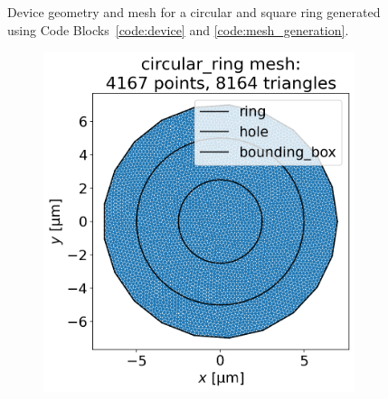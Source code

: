 \documentclass[preprint,12pt]{elsarticle}
\begin{document}
\begin{figure}
\begin{subfigure}{.45\textwidth}
  \label{fig:square_ring_mesh}
\end{subfigure}
\caption{Device geometry and mesh for a circular and square ring generated using Code Blocks~\ref{code:device} and \ref{code:mesh_generation}.}
\label{fig:ring_mesh}
\end{figure}

\begin{figure}
\centering
\begin{subfigure}{.45\textwidth}
  \centering
  \includegraphics[width=\linewidth]{examples/images/ring/circular_ring_mesh.png}
  \label{fig:circular_ring_mesh}
\end{subfigure}%
\begin{subfigure}{.45\textwidth}
  \centering

\end{subfigure}
\end{figure}
\end{document}
